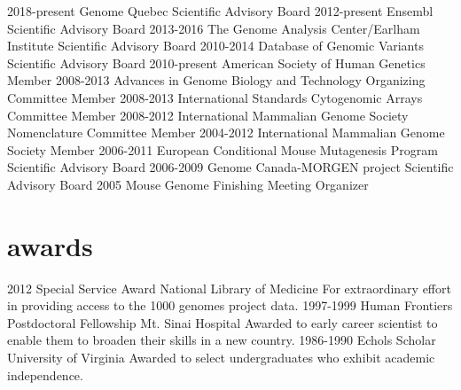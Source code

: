\documentclass[]{dmc-cv} %
\begin{document}
\begin{entrylist}
\smallentry
{2018-present}
{Genome Quebec}
{Scientific Advisory Board}
\smallentry
{2012-present}
{Ensembl}
{Scientific Advisory Board}
\smallentry
{2013-2016}
{The Genome Analysis Center/Earlham Institute}
{Scientific Advisory Board}
\smallentry
{2010-2014}
{Database of Genomic Variants}
{Scientific Advisory Board}
\smallentry
{2010-present}
{American Society of Human Genetics}
{Member}
\smallentry
{2008-2013}
{Advances in Genome Biology and Technology}
{Organizing Committee Member}
\smallentry
{2008-2013}
{International Standards Cytogenomic Arrays}
{Committee Member}
\smallentry
{2008-2012}
{International Mammalian Genome Society}
{Nomenclature Committee Member}
\smallentry
{2004-2012}
{International Mammalian Genome Society}
{Member}
\smallentry
{2006-2011}
{European Conditional Mouse Mutagenesis Program}
{Scientific Advisory Board}
\smallentry
{2006-2009}
{Genome Canada-MORGEN project}
{Scientific Advisory Board}
\smallentry
{2005}
{Mouse Genome Finishing Meeting}
{Organizer}
\end{entrylist}


\section{awards}

\begin{entrylist}
\entry
{2012}
{Special Service Award}
{National Library of Medicine}
{For extraordinary effort in providing access to the 1000 genomes project data.}
\entry
{1997-1999}
{Human Frontiers Postdoctoral Fellowship}
{Mt. Sinai Hospital}
{Awarded to early career scientist to enable them to broaden their skills in a new country.}
\entry
{1986-1990}
{Echols Scholar}
{University of Virginia}
{Awarded to select undergraduates who exhibit academic independence.}
\end{entrylist}
\end{document}
